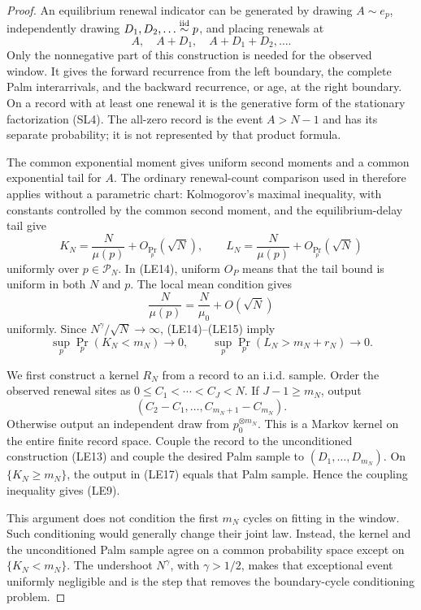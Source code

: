 \begin{proof}
An equilibrium renewal indicator can be generated by drawing
\(A\sim e_p\), independently drawing \(D_1,D_2,\ldots\stackrel{\rm iid}{\sim}p\),
and placing renewals at
\[
 A,\quad A+D_1,\quad A+D_1+D_2,\ldots .
\tag{LE13}
\]
Only the nonnegative part of this construction is needed for the observed
window.  It gives the forward recurrence from the left boundary, the
complete Palm interarrivals, and the backward recurrence, or age, at the
right boundary.  On a record with at least one renewal it is the generative
form of the stationary factorization \textup{(SL4)}.  The all-zero record is
the event \(A>N-1\) and has its separate probability; it is not represented
by that product formula.

The common exponential moment gives uniform second moments and a common
exponential tail for \(A\).  The ordinary renewal-count comparison used in
 therefore applies without a
parametric chart: Kolmogorov's maximal inequality, with constants controlled
by the common second moment, and the equilibrium-delay tail give
\[
 K_N=\frac N{\mu(p)}+O_{\Pr_p}(\sqrt N),
 \qquad
 L_N=\frac N{\mu(p)}+O_{\Pr_p}(\sqrt N)
\tag{LE14}
\]
uniformly over \(p\in\mathcal P_N\).  In \textup{(LE14)}, uniform
\(O_P\) means that the tail bound is uniform in both \(N\) and \(p\).
The local mean condition gives
\[
 \frac N{\mu(p)}=\frac N{\mu_0}+O(\sqrt N)
\tag{LE15}
\]
uniformly.  Since \(N^\gamma/\sqrt N\to\infty\),
\textup{(LE14)}--\textup{(LE15)} imply
\[
 \sup_p\Pr_p(K_N<m_N)\to0,
 \qquad
 \sup_p\Pr_p(L_N>m_N+r_N)\to0.
\tag{LE16}
\]

We first construct a kernel \(R_N\) from a record to an i.i.d. sample.
Order the observed renewal sites as
\(0\le C_1<\cdots<C_J<N\).  If \(J-1\ge m_N\), output
\[
 (C_2-C_1,\ldots,C_{m_N+1}-C_{m_N}).
\tag{LE17}
\]
Otherwise output an independent draw from \(p_0^{\otimes m_N}\).  This is a
Markov kernel on the entire finite record space.  Couple the record to the
unconditioned construction \textup{(LE13)} and couple the desired Palm
sample to \((D_1,\ldots,D_{m_N})\).  On \(\{K_N\ge m_N\}\), the output in
\textup{(LE17)} equals that Palm sample.  Hence the coupling inequality gives
\textup{(LE9)}.

This argument does not condition the first \(m_N\) cycles on fitting in the
window.  Such conditioning would generally change their joint law.  Instead,
the kernel and the unconditioned Palm sample agree on a common probability
space except on \(\{K_N<m_N\}\).  The undershoot \(N^\gamma\), with
\(\gamma>1/2\), makes that exceptional event uniformly negligible and is the
step that removes the boundary-cycle conditioning problem.


\end{proof}
